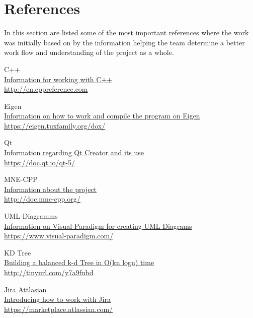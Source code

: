 \section{References}

In this section are listed some of the most important references where the work was initially based on by the information helping the team determine a better work flow and understanding of the project as a whole. 

\begin{aims}
	\item [C++] 
	\href{http://en.cppreference.com}
	{\\Information for working with C++}\\
		\url{http://en.cppreference.com}
	\item [Eigen] 
	\href{https://eigen.tuxfamily.org/dox/}{\\Information on how to work and compile the program on Eigen}
\\		\url{https://eigen.tuxfamily.org/dox/}
	\item [Qt] 
	\href{https://doc.qt.io/qt-5/}{\\Information regarding Qt Creator and its use}\\
		\url{https://doc.qt.io/qt-5/}
	\item [MNE-CPP]
	\href{http://doc.mne-cpp.org/}{\\Information about the project}\\
		\url{http://doc.mne-cpp.org/}
	\item [UML-Diagramms]
	\href{https://www.visual-paradigm.com/}{\\Information on Visual Paradigm for creating UML Diagrams}\\
		\url{https://www.visual-paradigm.com/}
	\item[KD Tree]
	\href{https://www.google.de/url?sa=t&source=web&rct=j&url=http://jcgt.org/published/0004/01/03/paper.pdf&ved=0ahUKEwjujpTLy-rUAhUQfFAKHT69BG8QFggfMAA&usg=AFQjCNGqWfqBlUcoTgtfbISsxhRz8E3GtA}{\\Building a balanced k-d Tree in O(kn logn) time}\\
	\url{http://tinyurl.com/y7a9fubd}
	\item [Jira Attlasian]
	\href{https://marketplace.atlassian.com/}{\\Introducing how to work with Jira}\\
	\url{https://marketplace.atlassian.com/}
	

	
\end{aims}